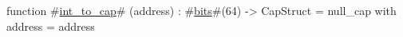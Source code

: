 function #\hyperref[zintzytozycap]{int\_to\_cap}# (address) : #\hyperref[zbits]{bits}#(64) -> CapStruct = 
    {null_cap with address = address}
